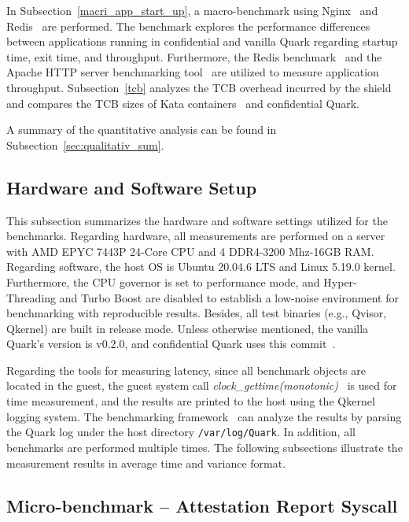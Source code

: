 In Subsection~\ref{macri_app_start_up},  a macro-benchmark using Nginx~\cite*{nginx} and Redis~\cite*{redis} are performed. The benchmark explores the performance differences between applications running in confidential and vanilla Quark regarding startup time, exit time, and throughput. Furthermore, the Redis benchmark~\cite*{Redis_benchmark} and the 
Apache HTTP server benchmarking tool~\cite*{ab} are utilized to measure application throughput. Subsection~\ref{tcb} analyzes the TCB overhead incurred by the shield and compares the TCB sizes of Kata containers~\cite*{Kata-Containers} and confidential Quark.  

A summary of the quantitative analysis can be found in Subsection~\ref{sec:qualitativ_sum}.



\subsection{Hardware and Software Setup}\label{Hardware_and_Software_Setup}

This subsection summarizes the hardware and software settings utilized for the benchmarks. Regarding hardware, all measurements are performed on a server with AMD EPYC 7443P 24-Core CPU and 4 DDR4-3200 Mhz-16GB RAM. Regarding software, the host OS is Ubuntu 20.04.6 LTS and Linux 5.19.0 kernel. 
Furthermore, the CPU governor is set to performance mode, and Hyper-Threading and Turbo Boost are disabled to establish a low-noise environment for benchmarking with reproducible results. Besides, all test binaries (e.g., Qvisor, Qkernel) are built in 
release mode. Unless otherwise mentioned, the vanilla Quark's version is v0.2.0, and confidential Quark uses this commit~\cite*{qualitativ_confidentail_quark}.


Regarding the tools for measuring latency, since all benchmark objects are located in the guest, the guest system call \emph{clock\_gettime(monotonic)}~\cite*{clock_gettime} is used for time measurement, and the results are printed to the host using the Qkernel logging system. The 
benchmarking framework~\cite*{benchamark_framework} can analyze the results by parsing the Quark log under the host directory \texttt{/var/log/Quark}. In addition, all benchmarks are performed multiple times. The following subsections illustrate the measurement results in average time and variance format.

\subsection{Micro-benchmark – Attestation Report Syscall}
\label{Attestation_Report_Syscall}

